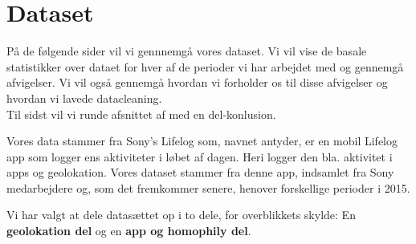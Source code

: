 \chapter{Dataset}
På de følgende sider vil vi gennnemgå vores dataset. Vi vil vise de basale statistikker over dataet for hver af de perioder vi har arbejdet med og gennemgå afvigelser. Vi vil også gennemgå hvordan vi forholder os til disse afvigelser og hvordan vi lavede datacleaning. \\
Til sidst vil vi runde afsnittet af med en del-konlusion. 

Vores data stammer fra Sony's Lifelog\cite{sonyLifeLog} som, navnet antyder, er en mobil Lifelog app som logger ens aktiviteter i løbet af dagen. Heri logger den bla. aktivitet i apps og geolokation. Vores dataset stammer fra denne app, indsamlet fra Sony medarbejdere og, som det fremkommer senere, henover forskellige perioder i 2015. %

Vi har valgt at dele datasættet op i to dele, for overblikkets skylde: En \textbf{geolokation del} og en \textbf{app og homophily del}.

